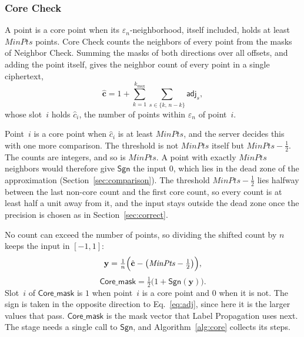 
\subsubsection{Core Check}
\label{sec:core}

A point is a core point when its $\varepsilon_n$-neighborhood, itself
included, holds at least $\mathit{MinPts}$ points. Core Check counts the
neighbors of every point from the masks of Neighbor Check. Summing the
masks of both directions over all offsets, and adding the point itself,
gives the neighbor count of every point in a single ciphertext,
\begin{equation}
  \label{eq:count}
  \hat{\mathbf{c}} = 1 + \sum_{k=1}^{k_{\max}}
    \sum_{s \in \{k,\, n-k\}} \mathsf{adj}_s ,
\end{equation}
whose slot~$i$ holds $\hat{c}_i$, the number of points within
$\varepsilon_n$ of point~$i$.

Point~$i$ is a core point when $\hat{c}_i$ is at least
$\mathit{MinPts}$, and the server decides this with one more comparison.
The threshold is not $\mathit{MinPts}$ itself but
$\mathit{MinPts} - \tfrac{1}{2}$. The counts are integers, and so is
$\mathit{MinPts}$. A point with exactly $\mathit{MinPts}$ neighbors would
therefore give $\mathsf{Sgn}$ the input $0$, which lies in the dead zone
of the approximation (Section~\ref{sec:comparison}). The threshold
$\mathit{MinPts} - \tfrac{1}{2}$ lies halfway between the last non-core
count and the first core count, so every count is at least half a unit
away from it, and the input stays outside the dead zone once the
precision is chosen as in Section~\ref{sec:correct}.

No count can exceed the number of points, so dividing the shifted count
by $n$ keeps the input in $[-1,1]$:
\begin{equation}
  \label{eq:coreinput}
  \mathbf{y} = \tfrac{1}{n} \Bigl( \hat{\mathbf{c}}
    - \bigl( \mathit{MinPts} - \tfrac{1}{2} \bigr) \Bigr),
\end{equation}
\begin{equation}
  \label{eq:core}
  \mathsf{Core\_mask} = \tfrac{1}{2}
    \bigl( 1 + \mathsf{Sgn}(\mathbf{y}) \bigr).
\end{equation}
Slot~$i$ of $\mathsf{Core\_mask}$ is $1$ when point~$i$ is a core point
and $0$ when it is not. The sign is taken in the opposite direction to
Eq.~\eqref{eq:adj}, since here it is the larger values that pass.
$\mathsf{Core\_mask}$ is the mask vector that Label Propagation uses
next. The stage needs a single call to $\mathsf{Sgn}$, and
Algorithm~\ref{alg:core} collects its steps.

